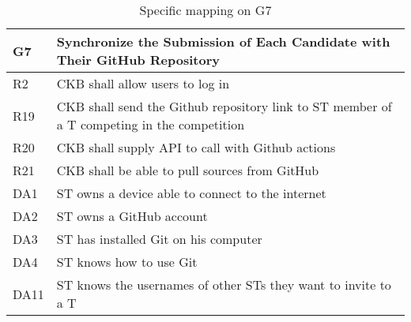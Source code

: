   \begin{table}[H]
    \begin{longtable}{|l|p{12cm}|}
      \hline
      \textbf{G7} & \textbf{Synchronize the Submission of Each Candidate with Their GitHub Repository}      \\
      \hline
      R2 & CKB shall allow users to log in \\
      \hline
      R19 & CKB shall send the Github repository link to ST member of a T competing in the competition \\
      \hline
      R20 & CKB shall supply API to call with Github actions \\
      \hline
      R21 & CKB shall be able to pull sources from GitHub \\
      \hline
      DA1 & ST owns a device able to connect to the internet \\
      \hline
      DA2 & ST owns a GitHub account \\
      \hline
      DA3 & ST has installed Git on his computer \\
      \hline
      DA4 & ST knows how to use Git \\
      \hline
      DA11 & ST knows the usernames of other STs they want to invite to a T \\
      \hline
    \end{longtable}
    \caption{Specific mapping on G7}
    \label{tab:mappingG7}
  \end{table}

